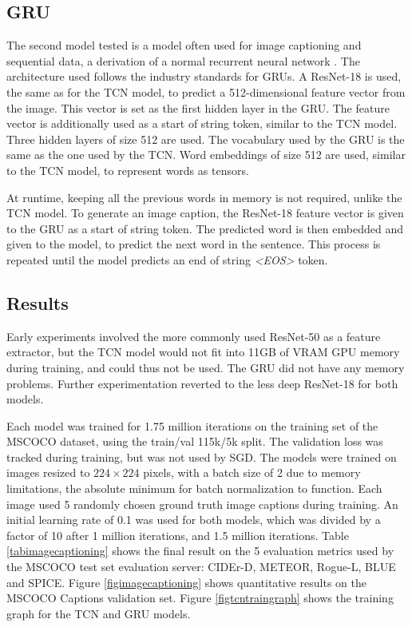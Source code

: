 \documentclass[a4paper, twoside]{article}
\begin{document}
\subsection{GRU}
The second model tested is a model often used for image captioning and sequential data, a derivation of a normal recurrent neural network \cite{cs231n}. The architecture used follows the industry standards for GRUs. A ResNet-18 is used, the same as for the TCN model, to predict a 512-dimensional feature vector from the image. This vector is set as the first hidden layer in the GRU. The feature vector is additionally used as a start of string token, similar to the TCN model. Three hidden layers of size 512 are used. The vocabulary used by the GRU is the same as the one used by the TCN. Word embeddings of size 512 are used, similar to the TCN model, to represent words as tensors.

At runtime, keeping all the previous words in memory is not required, unlike the TCN model. To generate an image caption, the ResNet-18 feature vector is given to the GRU as a start of string token. The predicted word is then embedded and given to the model, to predict the next word in the sentence. This process is repeated until the model predicts an end of string \textit{<EOS>} token.

\subsection{Results}
Early experiments involved the more commonly used ResNet-50 as a feature extractor, but the TCN model would not fit into 11GB of VRAM GPU memory during training, and could thus not be used. The GRU did not have any memory problems. Further experimentation reverted to the less deep ResNet-18 for both models.

Each model was trained for 1.75 million iterations on the training set of the MSCOCO dataset, using the train/val 115k/5k split. The validation loss was tracked during training, but was not used by SGD. The models were trained on images resized to $224 \times 224$ pixels, with a batch size of 2 due to memory limitations, the absolute minimum for batch normalization to function. Each image used 5 randomly chosen ground truth image captions during training. An initial learning rate of 0.1 was used for both models, which was divided by a factor of 10 after 1 million iterations, and 1.5 million iterations. Table \ref{tabimagecaptioning} shows the final result on the 5 evaluation metrics used by the MSCOCO test set evaluation server: CIDEr-D, METEOR, Rogue-L, BLUE and SPICE. Figure \ref{figimagecaptioning} shows quantitative results on the MSCOCO Captions validation set. Figure \ref{figtcntraingraph} shows the training graph for the TCN and GRU models.
\end{document}
